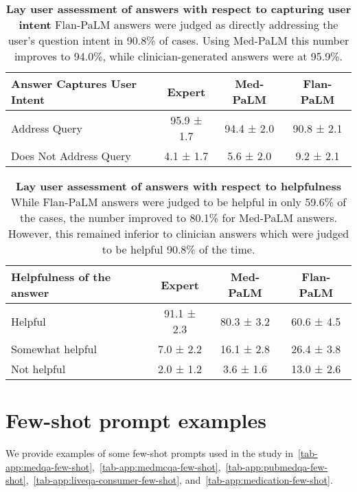 \begin{table}[]
\small
\centering
\caption{\textbf{Lay user assessment of  answers with respect to capturing user intent}  Flan-PaLM answers were judged as directly addressing the user’s question intent in 90.8\% of cases. Using Med-PaLM this number improves to 94.0\%, while clinician-generated answers were at 95.9\%.}
\vspace{3pt}
\label{tab:detailed-lay-task1}
\begin{tabular}{l|ccc}
\toprule
\textbf{Answer Captures User Intent} & \textbf{Expert} & \textbf{Med-PaLM} & \textbf{Flan-PaLM} \\ \hline
Address Query                        & 95.9 ± 1.7      & 94.4 ± 2.0        & 90.8 ± 2.1         \\ \hline
Does Not Address Query               & 4.1 ± 1.7       & 5.6 ± 2.0         & 9.2 ± 2.1         \\ \bottomrule
\end{tabular}
\end{table}


\begin{table}[]
\small
\centering
\caption{\textbf{Lay user assessment of  answers with respect to helpfulness} While Flan-PaLM answers were judged to be helpful in only 59.6\% of the cases, the number improved to 80.1\% for Med-PaLM answers. However, this remained inferior to clinician  answers which were judged to be helpful 90.8\% of the time.}
\vspace{3pt}
\label{tab:detailed-lay-task2}
\begin{tabular}{l|ccc}
\toprule
\textbf{Helpfulness of the answer} & \textbf{Expert} & \textbf{Med-PaLM} & \textbf{Flan-PaLM} \\ \hline
Helpful          & 91.1 ± 2.3 & 80.3 ± 3.2 & 60.6 ± 4.5 \\
Somewhat helpful & 7.0 ± 2.2  & 16.1 ± 2.8 & 26.4 ± 3.8 \\
Not helpful      & 2.0 ± 1.2  & 3.6 ± 1.6  & 13.0 ± 2.6 \\ \bottomrule
\end{tabular}
\end{table}









\section{Few-shot prompt examples}
\label{appendix:few-shot}
We provide examples of some few-shot prompts used in the study in~\cref{tab-app:medqa-few-shot},~\cref{tab-app:medmcqa-few-shot},~\cref{tab-app:pubmedqa-few-shot},~\cref{tab-app:liveqa-consumer-few-shot}, and~\cref{tab-app:medication-few-shot}.

